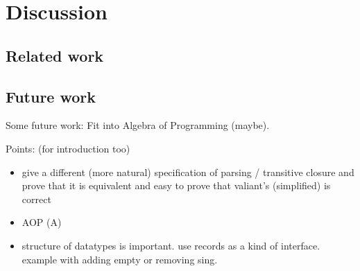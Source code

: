 \section{Discussion}
\subsection{Related work}
\subsection{Future work}
Some future work:
Fit into Algebra of Programming (maybe).

Points: (for introduction too)
\begin{itemize}
\item give a different (more natural) specification of parsing / transitive closure and prove that it is equivalent and easy to prove that valiant's (simplified) is correct 
\item AOP (A)
\item structure of datatypes is important. use records as a kind of interface. example with adding empty or removing sing.
\end{itemize}
